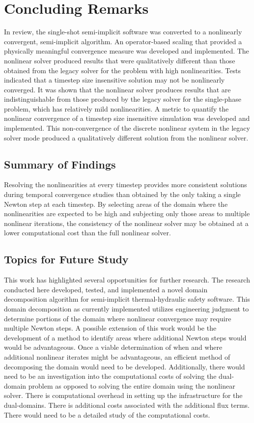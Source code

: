 \chapter{Concluding Remarks}
\label{chap:end}
In review, the single-shot semi-implicit \cobra{} software was converted to a nonlinearly convergent, semi-implicit algorithm.
An operator-based scaling that provided a physically meaningful convergence measure was developed and implemented.
The nonlinear solver produced results that were qualitatively different than those obtained from the legacy solver for the problem with high nonlinearities.
Tests indicated that a timestep size insensitive solution may not be nonlinearly converged.
It was shown that the nonlinear solver produces results that are indistinguishable from those produced by the legacy solver for the single-phase problem, which has relatively mild nonlinearities.
A metric to quantify the nonlinear convergence of a timestep size insensitive simulation was developed and implemented.
This non-convergence of the discrete nonlinear system in the legacy solver mode produced a qualitatively different solution from the nonlinear solver.

\section{Summary of Findings}
\label{sect:end:summary}
Resolving the nonlinearities at every timestep provides more consistent solutions during temporal convergence studies than obtained by the only taking a single Newton step at each timestep.
By selecting areas of the domain where the nonlinearities are expected to be high and subjecting only those areas to multiple nonlinear iterations, the consistency of the nonlinear solver may be obtained at a lower computational cost than the full nonlinear solver.

\section{Topics for Future Study}
\label{sect:end:future}
This work has highlighted several opportunities for further research.
The research conducted here developed, tested, and implemented a novel domain decomposition algorithm for semi-implicit thermal-hydraulic safety software.
This domain decomposition as currently implemented utilizes engineering judgment to determine portions of the domain where nonlinear convergence may require multiple Newton steps.
A possible extension of this work would be the development of a method to identify 
areas where additional Newton steps would would be advantageous.
Once a viable determination of when and where additional nonlinear iterates might be advantageous, an efficient method of decomposing the domain would need to be developed.
Additionally, there would need to be an investigation into the computational costs of solving the dual-domain problem as opposed to solving the entire domain using the nonlinear solver.
There is computational overhead in setting up the infrastructure for the dual-domains.
There is additional costs associated with the additional flux terms.
There would need to be a detailed study of the computational costs.
